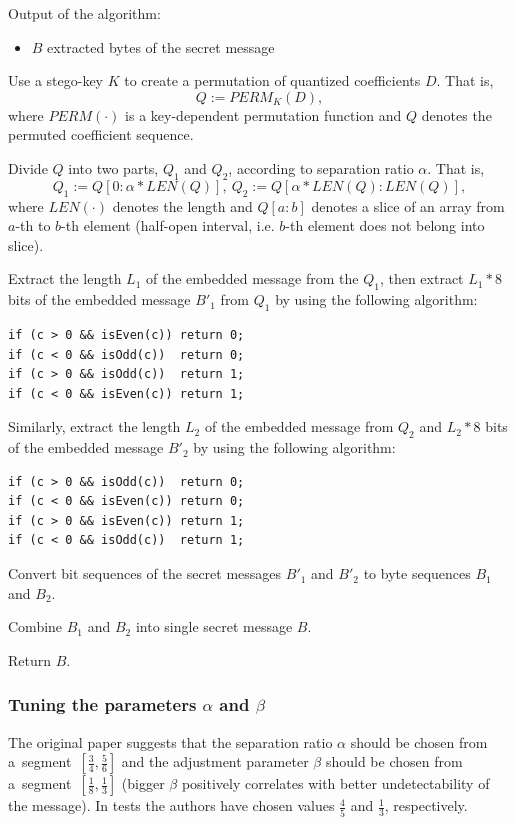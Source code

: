 Output of the algorithm:

\begin{itemize}
    \item $B$ extracted bytes of the secret message
\end{itemize}

\begin{Algo}
\item 
Use a stego-key $K$ to create a permutation of quantized coefficients $D$.
That is, $$Q := PERM_K(D),$$ where $PERM(\cdot)$ is a key-dependent
permutation function and $Q$ denotes the permuted coefficient sequence.
\item
Divide $Q$ into two parts, $Q_1$ and $Q_2$, according to separation ratio $\alpha$.
That is, $$Q_1 := Q[0 : \alpha * LEN(Q)],~ Q_2 := Q[\alpha * LEN(Q) : LEN(Q)],$$
where $LEN(\cdot)$ denotes the length and $Q[a : b]$ denotes a slice of an array from 
$a$-th to $b$-th element (half-open interval, i.e. $b$-th element does not belong into slice).
\item
Extract the length $L_1$ of the embedded message from the $Q_1$, then extract $L_1 * 8$ bits of
the embedded message $B'_1$ from $Q_1$ by using the following algorithm:
\begin{lstlisting}
if (c > 0 && isEven(c)) return 0;
if (c < 0 && isOdd(c))  return 0;
if (c > 0 && isOdd(c))  return 1;
if (c < 0 && isEven(c)) return 1;
\end{lstlisting}
\item
Similarly, extract the length $L_2$ of the embedded message from $Q_2$ and $L_2 * 8$ bits of the 
embedded message $B'_2$ by using the following algorithm:
\begin{lstlisting}
if (c > 0 && isOdd(c))  return 0;
if (c < 0 && isEven(c)) return 0;
if (c > 0 && isEven(c)) return 1;
if (c < 0 && isOdd(c))  return 1;
\end{lstlisting}
\item
Convert bit sequences of the secret messages $B'_1$ and $B'_2$ to byte sequences $B_1$ and $B_2$.
\item
Combine $B_1$ and $B_2$ into single secret message $B$.
\item 
Return $B$.

\end{Algo}

\subsubsection{Tuning the parameters $\alpha$ and $\beta$}
The original paper suggests that the separation ratio $\alpha$
should be chosen from a~segment~$\left[ \frac{3}{4}, \frac{5}{6} \right]$
and the adjustment parameter $\beta$ should be chosen from a~segment~$\left[\frac{1}{8}, \frac{1}{3}\right]$ 
(bigger $\beta$ positively correlates with
better undetectability of the message). 
In tests the authors have chosen
values $\frac{4}{5}$ and $\frac{1}{3}$, respectively.

